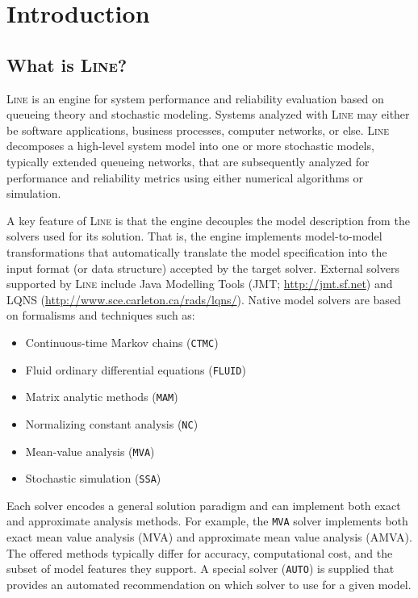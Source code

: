 \chapter{Introduction}
\label{Introduction}

\section{What is \textsc{Line}?}
\label{what-is-line?}
\textsc{Line} is an engine for system performance and reliability evaluation based on queueing theory and stochastic modeling. Systems analyzed with \textsc{Line} may either be software applications, business processes, computer networks, or else. \textsc{Line} decomposes a high-level system model into one or more stochastic models, typically extended queueing networks, that are subsequently analyzed for performance and reliability metrics using either numerical algorithms or simulation.

A key feature of \textsc{Line} is that the engine decouples the model description from the solvers used for its solution. That is, the engine implements model-to-model transformations that automatically translate the model specification into the input format (or data structure) accepted by the target solver. External solvers supported by \textsc{Line} include Java Modelling Tools (JMT; \url{http://jmt.sf.net}) and LQNS (\url{http://www.sce.carleton.ca/rads/lqns/}). Native model solvers are based on formalisms and techniques such as:
\begin{itemize}
\item Continuous-time Markov chains (\texttt{CTMC})
\item Fluid ordinary differential equations (\texttt{FLUID})
\item Matrix analytic methods (\texttt{MAM})
\item Normalizing constant analysis (\texttt{NC})
\item Mean-value analysis (\texttt{MVA})
\item Stochastic simulation (\texttt{SSA})
\end{itemize}
Each solver encodes a general solution paradigm and can implement both exact and approximate analysis methods. For example, the \texttt{MVA} solver implements both exact mean value analysis (MVA) and approximate mean value analysis (AMVA). The offered methods typically differ for accuracy, computational cost, and the subset of model features they support. A special solver (\texttt{AUTO}) is supplied that provides an automated recommendation on which solver to use for a given model.

